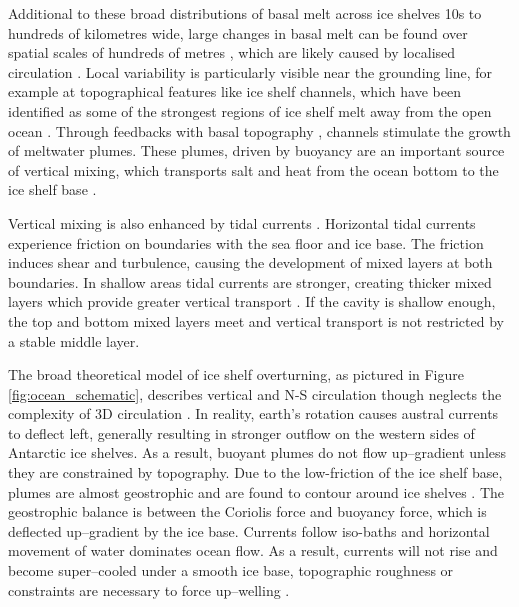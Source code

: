 Additional to these broad distributions of basal melt across ice shelves 10s to hundreds of kilometres wide, large changes in basal melt can be found over spatial scales of hundreds of metres \citep[e.g.][]{marsh2016high,stanton2013channelized,stewart2019basal}, which are likely caused by localised circulation \citep{sergienko2013regular}. Local variability is particularly visible near the grounding line, for example at topographical features like ice shelf channels, which have been identified as some of the strongest regions of ice shelf melt away from the open ocean \citep[e.g.][]{marsh2016high, stanton2013channelized}. 
Through feedbacks with basal topography \citep{sergienko2013regular},  channels stimulate the growth of meltwater plumes. These plumes, driven by buoyancy are an important source of vertical mixing, which transports salt and heat from the ocean bottom to the ice shelf base \citep{macayeal1984thermohaline}.


Vertical mixing is also enhanced by tidal currents \citep{macayeal1984thermohaline}.  Horizontal tidal currents experience friction on boundaries with the sea floor and ice base. The friction induces shear and turbulence, causing the development of mixed layers at both boundaries. In shallow areas tidal currents are stronger, creating  thicker mixed layers which provide greater vertical transport  \citep{makinson2002modeling}. If the cavity is shallow enough, the top and bottom mixed layers meet and vertical transport is not restricted by a stable middle layer.

The broad theoretical model of ice shelf overturning, as pictured in Figure \ref{fig:ocean_schematic}, describes vertical and N-S circulation though neglects the complexity of 3D circulation \citep{holland2006effects}. In reality, earth's rotation causes austral currents to deflect left, generally resulting in stronger outflow on the western sides of Antarctic ice shelves. As a result, buoyant plumes do not flow up--gradient unless they are constrained by topography. Due to the low-friction of the ice shelf base, plumes are almost geostrophic and are found to contour around ice shelves \citep{jenkins2016simple}. The geostrophic balance is between the Coriolis force and buoyancy force, which is deflected up--gradient by the ice base. Currents follow iso-baths and horizontal movement of water dominates ocean flow. As a result, currents will not rise and become super--cooled under a smooth ice base, topographic roughness or constraints are necessary to force up--welling \citep{holland2006effects}.

